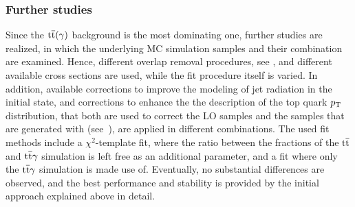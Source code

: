\subsubsection*{Further studies}
Since the ${\mathrm{t}\overline{\mathrm{t}}}(\gamma)$ background is the most dominating one, further studies are realized, in which the underlying MC simulation samples and their combination are examined. Hence, different overlap removal procedures, see , and different available cross sections are used, while the fit procedure itself is varied. In addition, available corrections to improve the modeling of jet radiation in the initial state, and corrections to enhance the the description of the top quark $p_{\mathrm{T}}$ distribution, that both are used to correct the LO samples and the samples that are generated with \POWHEG (see~), are applied in different combinations. The used fit methods include a $\chi^2$-template fit, where the ratio between the fractions of the ${\mathrm{t}\overline{\mathrm{t}}}$ and ${\mathrm{t}\overline{\mathrm{t}}}\gamma$ simulation is left free as an additional parameter, and a fit where only the ${\mathrm{t}\overline{\mathrm{t}}}\gamma$ simulation is made use of. Eventually, no substantial differences are observed, and the best performance and stability is provided by the initial approach explained above in detail.



